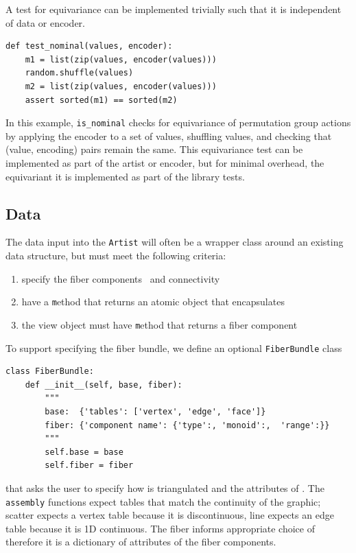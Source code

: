 \documentclass[../main.tex]{subfiles}
\begin{document}
A test for equivariance can be implemented trivially such that it is independent of data or encoder.
\begin{verbatim}
def test_nominal(values, encoder):
    m1 = list(zip(values, encoder(values)))
    random.shuffle(values)
    m2 = list(zip(values, encoder(values)))
    assert sorted(m1) == sorted(m2)
\end{verbatim}
In this example, \texttt{is_nominal} checks for equivariance of permutation group actions by applying the encoder to a set of values, shuffling values, and checking that (value, encoding) pairs remain the same. This equivariance test can be implemented as part of the artist or encoder, but for minimal overhead, the equivariant it is implemented as part of the library tests.

\subsection{Data \dtotal}
\label{sec:code_data}
The data input into the \texttt{Artist} will often be a wrapper class around an existing data structure, but must meet the following criteria:
\begin{enumerate}
\item specify the fiber components \dfiber\ and connectivity \dbase\
\item have a \texttt method that returns an atomic object that encapsulates \dsection\
\item the view object must have \texttt method that returns a fiber component
\end{enumerate}
To support specifying the fiber bundle, we define an optional \texttt{FiberBundle} class

\begin{verbatim}
class FiberBundle:
    def __init__(self, base, fiber):
        """
        base:  {'tables': ['vertex', 'edge', 'face']}
        fiber: {'component name': {'type':, 'monoid':,  'range':}}
        """
        self.base = base
        self.fiber = fiber
\end{verbatim}

that asks the user to specify how \dbase is triangulated and the attributes of \dfiber. The \texttt{assembly} functions expect tables that match the continuity of the graphic; scatter expects a vertex table because it is discontinuous, line expects an edge table because it is 1D continuous. The fiber informs appropriate choice of \vchannel\, therefore it is a dictionary of attributes of the fiber components.  
\end{document}
